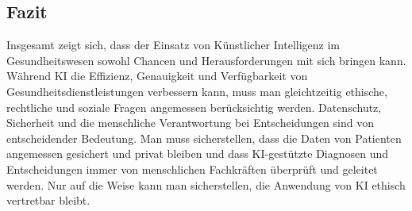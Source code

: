 \documentclass{article}
\begin{document}
\newpage
\subsection {Fazit}

Insgesamt zeigt sich, dass der Einsatz von Künstlicher Intelligenz im Gesundheitswesen sowohl Chancen
und Herausforderungen mit sich bringen kann. Während KI die Effizienz, Genauigkeit und Verfügbarkeit
von Gesundheitsdienstleistungen verbessern kann, muss man gleichtzeitig ethische, rechtliche und soziale Fragen angemessen berücksichtig werden.
Datenschutz, Sicherheit und die menschliche Verantwortung bei Entscheidungen sind von entscheidender Bedeutung. Man muss sicherstellen,
dass die Daten von Patienten angemessen gesichert und privat bleiben und dass KI-gestützte
Diagnosen und Entscheidungen immer von menschlichen Fachkräften überprüft und geleitet werden. Nur auf die Weise
kann man sicherstellen, die Anwendung von KI ethisch vertretbar bleibt.









\printbibliography
\end{document}
